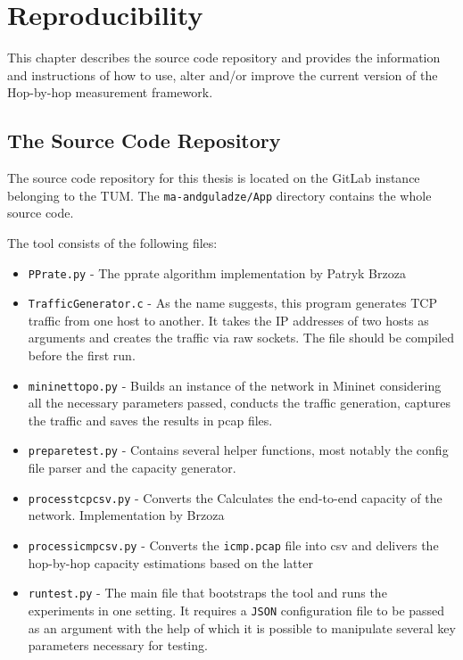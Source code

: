 \chapter{Reproducibility}
This chapter describes the source code repository and provides the information and  instructions of how to use, alter and/or improve the current version of the Hop-by-hop measurement framework. 

\section{The Source Code Repository}
The source code repository for this thesis is located on the GitLab instance belonging to the TUM. The \texttt{ma-andguladze/App} directory contains the whole source code.

The tool consists of the following files:
\begin{itemize}
  \item \texttt{PPrate.py} - The pprate algorithm implementation by Patryk Brzoza\cite{Brzoza}
  \item \texttt{TrafficGenerator.c} - As the name suggests, this program generates TCP traffic from one host to another. It takes the IP addresses of two hosts as arguments and creates the traffic via raw sockets. The file should be compiled before the first run.
  \item \texttt{mininet\textunderscore topo.py} - Builds an instance of the network in Mininet considering all the necessary parameters passed, conducts the traffic generation, captures the traffic and saves the results in pcap files.
  \item \texttt{prepare\textunderscore test.py} - Contains several helper functions, most notably the config file parser and the capacity generator.
  \item \texttt{process\textunderscore tcp\textunderscore csv.py} - Converts the Calculates the end-to-end capacity of the network. Implementation by Brzoza\cite{Brzoza}
  \item \texttt{process\textunderscore icmp\textunderscore csv.py} - Converts the \texttt{icmp.pcap} file into csv and delivers the hop-by-hop capacity estimations based on the latter 
  \item \texttt{run\textunderscore test.py} - The main file that bootstraps the tool and runs the experiments in one setting. It requires a \texttt{JSON} configuration file to be passed as an argument with the help of which it is possible to manipulate several key parameters necessary for testing.
\end{itemize}

